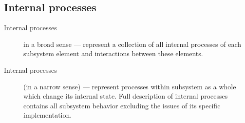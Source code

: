 


\subsection{Internal processes}
\begin{description}
  \item [Internal processes] in a broad sense --- represent a collection of all internal processes of each subsystem element and interactions between these elements.

  \item [Internal processes] (in a narrow sense) --- represent processes within subsystem as a whole which change its internal state. Full description of internal processes contains all subsystem behavior excluding the issues of its specific implementation.
\end{description}
